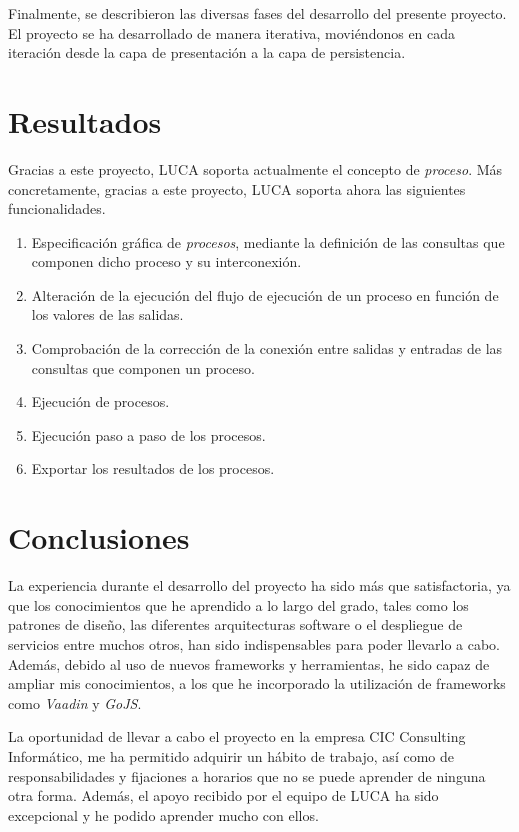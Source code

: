 Finalmente, se describieron las diversas fases del desarrollo del presente proyecto. El proyecto se ha desarrollado de manera iterativa, moviéndonos en cada iteración desde la capa de presentación a la capa de persistencia. 

\section{Resultados}

Gracias a este proyecto, LUCA soporta actualmente el concepto de \emph{proceso}. Más concretamente, gracias a este proyecto, LUCA soporta ahora las siguientes funcionalidades. 

\begin{enumerate}
	\item Especificación gráfica de \emph{procesos}, mediante la definición de las consultas que componen dicho proceso y su interconexión.
	\item Alteración de la ejecución del flujo de ejecución de un proceso en función de los valores de las salidas.
    \item Comprobación de la corrección de la conexión entre salidas y entradas de las consultas que componen un proceso.
    \item Ejecución de procesos.
	\item Ejecución paso a paso de los procesos.
	\item Exportar los resultados de los procesos.
\end{enumerate}

\section{Conclusiones}


La experiencia durante el desarrollo del proyecto ha sido más que satisfactoria, ya que los conocimientos que he aprendido a lo largo del grado, tales como los patrones de diseño, las diferentes arquitecturas software o el despliegue de servicios entre muchos otros, han sido indispensables para poder llevarlo a cabo. Además, debido al uso de nuevos frameworks y herramientas, he sido capaz de ampliar mis conocimientos, a los que he incorporado la utilización de frameworks como \emph{Vaadin} y \emph{GoJS}.

La oportunidad de llevar a cabo el proyecto en la empresa CIC Consulting Informático, me ha permitido adquirir un hábito de trabajo, así como de responsabilidades y fijaciones a horarios que no se puede aprender de ninguna otra forma. Además, el apoyo recibido por el equipo de LUCA ha sido excepcional y he podido aprender mucho con ellos.

